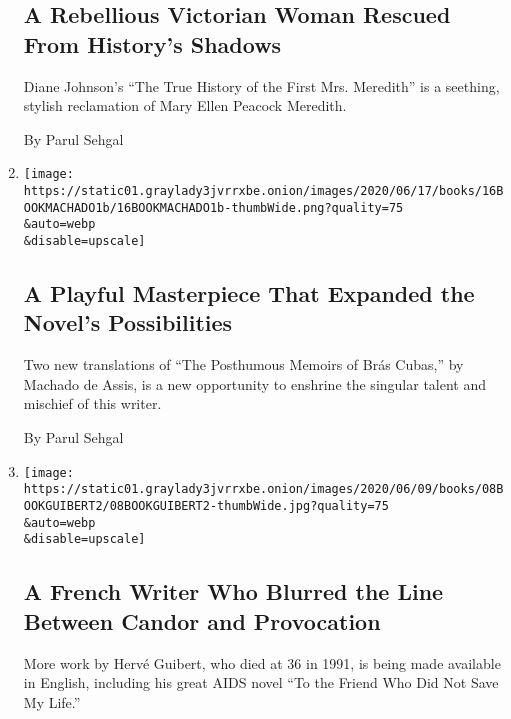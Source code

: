 \begin{enumerate}
  \hypertarget{a-rebellious-victorian-woman-rescued-from-historys-shadows}{%
  \subsection{A Rebellious Victorian Woman Rescued From History's
  Shadows}\label{a-rebellious-victorian-woman-rescued-from-historys-shadows}}

  Diane Johnson's ``The True History of the First Mrs. Meredith'' is a
  seething, stylish reclamation of Mary Ellen Peacock Meredith.

  By Parul Sehgal
\item
  \href{/2020/06/16/books/review-posthumous-memoirs-bras-cubas-machado-de-assis.html}{}

  \texttt{[image: https://static01.graylady3jvrrxbe.onion/images/2020/06/17/books/16BOOKMACHADO1b/16BOOKMACHADO1b-thumbWide.png?quality=75\\\&auto=webp\\\&disable=upscale]}

  \hypertarget{a-playful-masterpiece-that-expanded-the-novels-possibilities}{%
  \subsection{A Playful Masterpiece That Expanded the Novel's
  Possibilities}\label{a-playful-masterpiece-that-expanded-the-novels-possibilities}}

  Two new translations of ``The Posthumous Memoirs of Brás Cubas,'' by
  Machado de Assis, is a new opportunity to enshrine the singular talent
  and mischief of this writer.

  By Parul Sehgal
\item
  \href{/2020/06/08/books/review-herve-guibert-to-friend-who-did-not-save-my-life-written-in-invisible-ink.html}{}

  \texttt{[image: https://static01.graylady3jvrrxbe.onion/images/2020/06/09/books/08BOOKGUIBERT2/08BOOKGUIBERT2-thumbWide.jpg?quality=75\\\&auto=webp\\\&disable=upscale]}

  \hypertarget{a-french-writer-who-blurred-the-line-between-candor-and-provocation}{%
  \subsection{A French Writer Who Blurred the Line Between Candor and
  Provocation}\label{a-french-writer-who-blurred-the-line-between-candor-and-provocation}}

  More work by Hervé Guibert, who died at 36 in 1991, is being made
  available in English, including his great AIDS novel ``To the Friend
  Who Did Not Save My Life.''


\end{enumerate}
